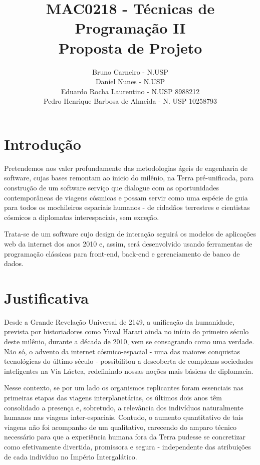 \documentclass[12pt]{exam}
\title{MAC0218 - Técnicas de Programação II \\ Proposta de Projeto}
\author{Bruno Carneiro - N.USP \\ Daniel Nunes - N.USP \\ Eduardo Rocha Laurentino - N.USP 8988212 \\ Pedro Henrique Barbosa de Almeida - N. USP 10258793}
\date{}
\begin{document}
	\clearpage
	\pagestyle{plain}
	\maketitle
	
\section{Introdução} 
	
	
	Pretendemos nos valer profundamente das metodologias ágeis de engenharia de software, cujas bases remontam ao inicio do milênio, na Terra pré-unificada, para construção de um software serviço que dialogue com as oportunidades contemporâneas de viagens cósmicas e possam servir como uma espécie de guia para todos os mochileiros espaciais humanos - de cidadãos terrestres e cientistas cósmicos a diplomatas interespaciais, sem exceção. 
	
	Trata-se de um software cujo design de interação seguirá os modelos de aplicações web da internet dos anos 2010 e, assim, será desenvolvido usando ferramentas de programação clássicas para front-end, back-end e gerenciamento de banco de dados. 

\section{Justificativa}
	
	Desde a Grande Revelação Universal de 2149, a unificação da humanidade, prevista por historiadores como Yuval Harari ainda no início do primeiro século deste milênio, durante a década de 2010, vem se consagrando como uma verdade. Não só, o advento da internet cósmico-espacial - uma das maiores conquistas tecnológicas do último século - possibilitou a descoberta de complexas sociedades inteligentes na Via Láctea, redefinindo nossas noções mais básicas de diplomacia.
	
	Nesse contexto, se por um lado os organismos replicantes foram essenciais nas primeiras etapas das viagens interplanetárias, os últimos dois anos têm consolidado a presença e, sobretudo, a relevância dos indivíduos naturalmente humanos nas viagens inter-espaciais. Contudo, o aumento quantitativo de tais viagens não foi acompanho de um qualitativo, carecendo do amparo técnico necessário para que a experiência humana fora da Terra pudesse se concretizar como efetivamente divertida, promissora e segura - independente das atribuições de cada indivíduo no Império Intergalático. 
	
\end{document}
